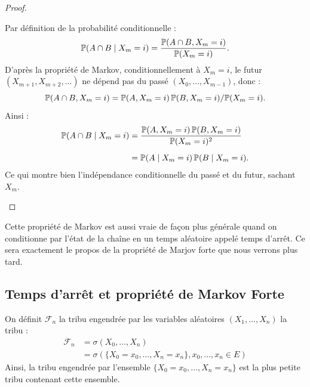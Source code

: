 \begin{proof}
\begin{enumerate}
        Par définition de la probabilité conditionnelle :
        \[
            \mathbb{P}(A \cap B \mid X_m = i)
            = \frac{\mathbb{P}(A \cap B, X_m = i)}{\mathbb{P}(X_m = i)}.
        \]
        D’après la propriété de Markov, conditionnellement à $X_m = i$, le futur $(X_{m+1}, X_{m+2}, \dots)$ 
        ne dépend pas du passé $(X_0, \dots, X_{m-1})$, donc :
        \[
            \mathbb{P}(A \cap B, X_m = i)
            = \mathbb{P}(A, X_m = i)\,\mathbb{P}(B, X_m = i) / \mathbb{P}(X_m = i).
        \]
        Ainsi :
        \begin{align*}
            \mathbb{P}(A \cap B \mid X_m = i)
            &= \frac{\mathbb{P}(A, X_m = i)\,\mathbb{P}(B, X_m = i)}{\mathbb{P}(X_m = i)^2} \\[0.5em]
            &= \mathbb{P}(A \mid X_m = i)\,\mathbb{P}(B \mid X_m = i).
        \end{align*}
        Ce qui montre bien l’indépendance conditionnelle du passé et du futur, sachant $X_m$.
    \end{enumerate}
\end{proof}

\begin{remark}
    Cette propriété de Markov est aussi vraie de façon plus générale quand on conditionne par l'état de la chaîne en un 
    temps aléatoire appelé temps d'arrêt. Ce sera exactement le propos de la propriété de Marjov forte que nous verrons 
    plus tard. 
\end{remark}

\subsection{Temps d'arrêt et propriété de Markov Forte}

\begin{definition}
    On définit $ \mathcal{F}_n$ la tribu engendrée par les variables aléatoires $(X_1, \dots, X_n)$ la tribu : 
        \begin{align*}
            \mathcal{F}_n &= \sigma \left(X_0, \dots, X_n\right) \\ 
            &= \sigma \left( \{X_0 = x_0, \dots, X_n = x_n\}, x_0, \dots, x_n \in E\right) 
        \end{align*} 
    Ainsi, la tribu engendrée par l'ensemble $ \{X_0 = x_0, \dots, X_n = x_n\}$ est la plus petite tribu 
    contenant cette ensemble. 
\end{definition}

